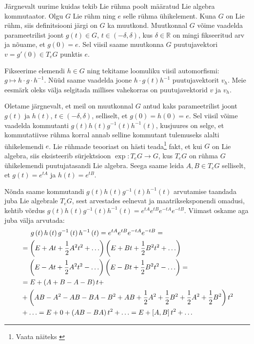 \documentclass[a4paper,12pt]{article}
\theoremstyle{plain}
\theoremstyle{definition}
\numberwithin{equation}{section}
\def\R{{\mathbb R}}
\begin{document}
Järgnevalt uurime kuidas tekib Lie rühma poolt määratud Lie algebra kommutaator. Olgu $G$ Lie rühm ning $e$ selle rühma ühikelement. Kuna $G$ on Lie rühm, siis definitsiooni järgi on $G$ ka muutkond. Muutkonnal $G$ võime vaadelda parameetrilist joont $g\left(t\right) \in G$, $t \in \left(-\delta, \delta\right)$, kus $\delta \in \R$ on mingi fikseeritud arv ja nõuame, et $g\left(0\right) = e$. Sel viisil saame muutkonna $G$ puutujavektori $v = g'\left(0\right) \in T_e G$ punktis $e$.

Fikseerime elemendi $h \in G$ ning tekitame loomuliku viisil automorfismi: $g \mapsto h \cdot g \cdot h^{-1}$. Nüüd saame vaadelda joone $h \cdot g\left(t\right) h^{-1}$ puutujavektorit $v_h$. Meie eesmärk oleks välja selgitada millises vahekorras on puutujavektorid $v$ ja $v_h$.

Oletame järgnevalt, et meil on muutkonnal $G$ antud kaks parameetrilist joont $g\left(t\right)$ ja $h\left(t\right)$, $t \in \left(-\delta, \delta\right)$, selliselt, et $g\left(0\right) = h\left(0\right) = e$. Sel viisil võime vaadelda kommutanti $g\left(t\right) h\left(t\right) g^{-1}\left(t\right) h^{-1}\left(t\right)$, kusjuures on selge, et kommutatiivse rühma korral annab selline kommutant tulemuseks alalti ühikelemendi $e$. Lie rühmade teooriast on hästi teada\footnote{Vaata näiteks \cite[Exponential map]{Kirillov}} fakt, et kui $G$ on Lie algebra, siis eksisteerib sürjektsioon $\exp : T_e G \rightarrow G$, kus $T_e G$ on rühma $G$ ühikelemendi puutujatasandi Lie algebra. Seega saame leida $A, B \in T_e G$ selliselt, et $g\left(t\right) = e^{tA}$ ja $h\left(t\right) = e^{tB}$. 

Nõnda saame kommutandi $g\left(t\right) h\left(t\right) g^{-1}\left(t\right) h^{-1}\left(t\right)$ arvutamise taandada juba Lie algebrale $T_e G$, sest arvestades eelnevat ja maatrikseksponendi omadusi, kehtib võrdus $g\left(t\right) h\left(t\right) g^{-1}\left(t\right) h^{-1}\left(t\right) = e^{tA} e^{tB} e^{-tA} e^{-tB}$. Viimast oskame aga juba välja arvutada:
\begin{align*}
&\hphantom{=}\ \ g\left(t\right) h\left(t\right) g^{-1}\left(t\right) h^{-1}\left(t\right) = e^{tA} e^{tB} e^{-tA} e^{-tB} = \\
&= \left(E + At + \frac{1}{2}A^2 t^2 + \ldots \right) \left(E + Bt + \frac{1}{2}B^2 t^2 + \ldots \right) \\
&\hphantom{=}\ \left(E - At + \frac{1}{2}A^2 t^2 - \ldots \right) \left(E - Bt + \frac{1}{2}B^2 t^2 - \ldots \right) = \\
&= E + \left(A + B - A - B\right)t + \\
&+ \left(AB - A^2 - AB - BA - B^2 + AB + \frac{1}{2} A^2 + \frac{1}{2} B^2 + \frac{1}{2} A^2 + \frac{1}{2} B^2\right)t^2 \\
&+ \ldots = E + 0 + \left(AB - BA\right)t^2 + \ldots = E + \left[A, B\right]t^2 + \ldots
\end{align*}
\end{document}

